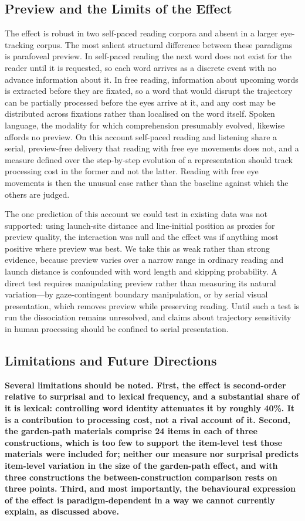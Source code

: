 \documentclass[12pt]{article}
\newcommand{\new}[1]{{\bfseries #1}}
\begin{document}
\new{\subsection{Preview and the Limits of the Effect}

The effect is robust in two self-paced reading corpora and absent in a larger eye-tracking corpus. The most salient structural difference between these paradigms is parafoveal preview. In self-paced reading the next word does not exist for the reader until it is requested, so each word arrives as a discrete event with no advance information about it. In free reading, information about upcoming words is extracted before they are fixated, so a word that would disrupt the trajectory can be partially processed before the eyes arrive at it, and any cost may be distributed across fixations rather than localised on the word itself. Spoken language, the modality for which comprehension presumably evolved, likewise affords no preview. On this account self-paced reading and listening share a serial, preview-free delivery that reading with free eye movements does not, and a measure defined over the step-by-step evolution of a representation should track processing cost in the former and not the latter. Reading with free eye movements is then the unusual case rather than the baseline against which the others are judged.

The one prediction of this account we could test in existing data was not supported: using launch-site distance and line-initial position as proxies for preview quality, the interaction was null and the effect was if anything most positive where preview was best. We take this as weak rather than strong evidence, because preview varies over a narrow range in ordinary reading and launch distance is confounded with word length and skipping probability. A direct test requires manipulating preview rather than measuring its natural variation---by gaze-contingent boundary manipulation, or by serial visual presentation, which removes preview while preserving reading. Until such a test is run the dissociation remains unresolved, and claims about trajectory sensitivity in human processing should be confined to serial presentation.}

\subsection{Limitations and Future Directions}

\new{Several limitations should be noted. First, the effect is second-order relative to surprisal and to lexical frequency, and a substantial share of it is lexical: controlling word identity attenuates it by roughly 40\%. It is a contribution to processing cost, not a rival account of it. Second, the garden-path materials comprise 24 items in each of three constructions, which is too few to support the item-level test those materials were included for; neither our measure nor surprisal predicts item-level variation in the size of the garden-path effect, and with three constructions the between-construction comparison rests on three points. Third, and most importantly, the behavioural expression of the effect is paradigm-dependent in a way we cannot currently explain, as discussed above.}
\end{document}
